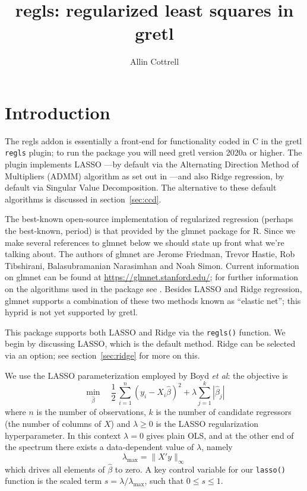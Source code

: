 \documentclass{article}
\title{regls: regularized least squares in gretl}
\author{Allin Cottrell}
\begin{document}
\maketitle

\section{Introduction}
\label{sec:intro}

The \textsf{regls} addon is essentially a front-end for functionality
coded in C in the gretl \texttt{regls} plugin; to run the package you
will need gretl version 2020a or higher.  The plugin implements LASSO
\citep{tibshirani96}---by default via the Alternating Direction Method
of Multipliers (ADMM) algorithm as set out in \cite{boyd2010}---and
also Ridge regression, by default via Singular Value Decomposition.
The alternative to these default algorithms is discussed in
section~\ref{sec:ccd}.

The best-known open-source implementation of regularized regression
(perhaps the best-known, period) is that provided by the
\textsf{glmnet} package for \textsf{R}. Since we make several
references to \textsf{glmnet} below we should state up front what
we're talking about. The authors of \textsf{glmnet} are Jerome
Friedman, Trevor Hastie, Rob Tibshirani, Balasubramanian Narasimhan
and Noah Simon. Current information on \textsf{glmnet} can be found at
\url{https://glmnet.stanford.edu/}; for further information on the
algorithms used in the package see \cite{glmnet10}. Besides LASSO and
Ridge regression, \textsf{glmnet} supports a combination of these two
methods known as ``elastic net''; this hyprid is not yet supported by
gretl.

This package supports both LASSO and Ridge via the \texttt{regls()}
function. We begin by discussing LASSO, which is the default method.
Ridge can be selected via an option; see section~\ref{sec:ridge} for
more on this.

We use the LASSO parameterization employed by Boyd \textit{et al}: the
objective is
\begin{equation}
  \label{eq:obj}
  \min_{\hat{\beta}} \quad \frac{1}{2}\,
  \sum_{i=1}^n (y_i - X_i\hat{\beta})^2 + \lambda \sum_{j=1}^k |\hat{\beta}_j|
\end{equation}
where $n$ is the number of observations, $k$ is the number of
candidate regressors (the number of columns of $X$) and
$\lambda \geq 0$ is the LASSO regularization hyperparameter. In this
context $\lambda = 0$ gives plain OLS, and at the other end of the
spectrum there exists a data-dependent value of $\lambda$, namely
\begin{equation}
  \label{eq:lmax}
  \lambda_{\max} = \|X'y\|_{\infty}
\end{equation}
which drives all elements of $\hat{\beta}$ to zero.  A key control
variable for our \texttt{lasso()} function is the scaled term
$s = \lambda/\lambda_{\max}$, such that $0 \leq s \leq 1$.
\end{document}
